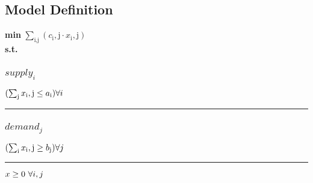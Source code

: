 \documentclass[11pt]{article}
\begin{document}
\subsection*{Model Definition}
\textbf{min} $\sum_\text{i,j} (c_\text{i},\text{j} \cdot x_\text{i},\text{j})$\\
\textbf{s.t.}
\subsubsection*{$supply_{i}$}
$
(\sum_\text{j} x_\text{i},\text{j} \leq a_\text{i})\hfill \forall i
$
\vspace{5pt}
\hrule
\subsubsection*{$demand_{j}$}
$
(\sum_\text{i} x_\text{i},\text{j} \geq b_\text{j})\hfill \forall j
$
\vspace{5pt}
\hrule
\bigskip
$x\geq 0 ~ \forall i,j\\$
\end{document}
